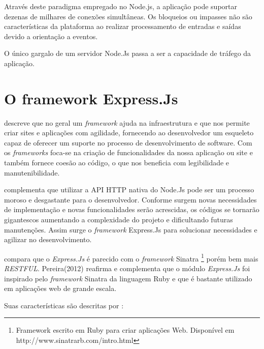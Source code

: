   Através deste paradigma empregado no Node.js, a aplicação pode 
  suportar dezenas de milhares de conexões simultâneas. Os bloqueios ou impasses não são características da plataforma ao
  realizar processamento de entradas e saídas devido a orientação a eventos. \cite{Abernethy:2011}
  
  O único gargalo de um servidor Node.Js passa a ser a capacidade de tráfego da aplicação.\cite{Oliveira:2012} 


\section{O framework Express.Js}
\label{framework-express}

   descreve que no geral um \textit{framework} ajuda na infraestrutura e que nos permite criar sites e aplicações
  com agilidade, fornecendo ao desenvolvedor um esqueleto capaz de oferecer um suporte no processo de desenvolvimento de
  software. Com os \textit{frameworks} foca-se na criação de funcionalidades da nossa aplicação ou site e 
  também fornece coesão ao código, o que nos beneficia com legibilidade e manutenibilidade.

   complementa que utilizar a API HTTP nativa do Node.Js pode ser um processo moroso e desgastante
  para o desenvolvedor. 
  Conforme surgem novas necessidades de implementação e novas funcionalidades serão acrescidas,
  os códigos se tornarão gigantescos aumentando a complexidade do projeto e dificultando futuras manutenções. Assim surge o 
  \textit{framework} Express.Js para solucionar necessidades e agilizar no desenvolvimento.
  
   compara que o \textit{Express.Js} é parecido com o \textit{framework} Sinatra \footnote{Framework escrito em Ruby para criar aplicações Web. 
  Disponível em http://www.sinatrarb.com/intro.html} porém bem mais \textit{RESTFUL}. 
  Pereira(2012) reafirma e complementa que o módulo \textit{Express.Js} foi inspirado pelo \textit{framework} Sinatra da 
  linguagem Ruby e que é bastante utilizado em aplicações web de grande escala.
  
  Suas características são descritas por :
  
